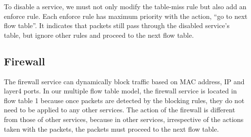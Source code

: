 \documentclass[conference]{IEEEtran}
\begin{document}
To disable a service, we must not only modify the table-miss rule but also add an enforce rule. Each enforce rule has maximum priority with the action, ``go to next flow table''. It indicates that packets still pass through the disabled service’s table, but ignore other rules and proceed to the next flow table.



\subsection{Firewall}
The firewall service can dynamically block traffic based on MAC address, IP and layer4 ports.
In our multiple flow table model, the firewall service is located in flow table 1 because once packets are detected by the blocking rules, they do not need to be applied to any other services.
The action of the firewall is different from those of other services, because in other services, irrespective of the actions taken with the packets, the packets must proceed to the next flow table.
%
\end{document}
